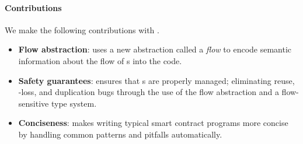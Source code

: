 \documentclass[dvipsnames, usenames, sigconf]{acmart}
\begin{document}
\paragraph{Contributions}

We make the following contributions with \langName.
\begin{itemize}
    \item \textbf{Flow abstraction}: \langName uses a new abstraction called a \emph{flow} to encode semantic information about the flow of \assetTxt{}s into the code.
    \item \textbf{Safety guarantees}: \langName ensures that \assetTxt{}s are properly managed; eliminating reuse, \assetTxt-loss, and duplication bugs through the use of the flow abstraction and a flow-sensitive type system.
    \item \textbf{Conciseness}: \langName makes writing typical smart contract programs more concise by handling common patterns and pitfalls automatically.
\end{itemize}


\end{document}
